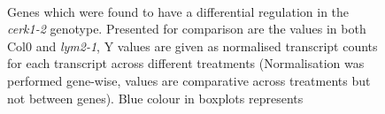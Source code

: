 \documentclass[../main.tex]{subfiles}
\begin{document}
\begin{figure}[!ht]
  \\
  
  \caption{Genes which were found to have a differential regulation in the
    \textit{cerk1-2} genotype. Presented for comparison are the values in both
    Col0 and \textit{lym2-1}, Y values are given as normalised transcript counts
    for each transcript across different treatments (Normalisation was performed
    gene-wise, values are comparative across treatments but not between genes).
    Blue colour in boxplots represents }
  \label{fig:cerk}
\end{figure}
\end{document}
